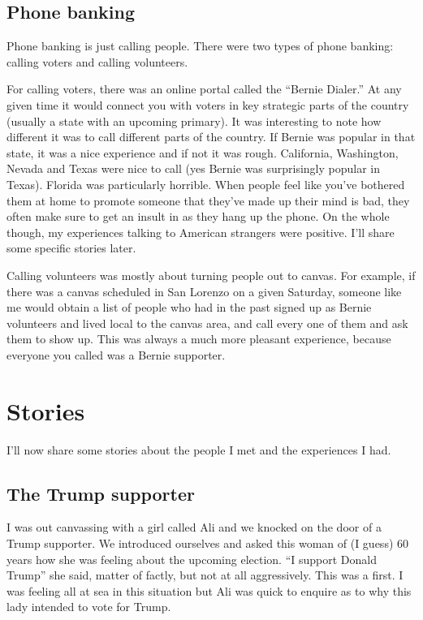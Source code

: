 \documentclass[]{book}
\begin{document}
\hypertarget{phone-banking}{%
\section{Phone banking}\label{phone-banking}}

Phone banking is just calling people. There were two types of phone banking: calling voters and calling volunteers.

For calling voters, there was an online portal called the ``Bernie Dialer.'' At any given time it would connect you with voters in key strategic parts of the country (usually a state with an upcoming primary). It was interesting to note how different it was to call different parts of the country. If Bernie was popular in that state, it was a nice experience and if not it was rough. California, Washington, Nevada and Texas were nice to call (yes Bernie was surprisingly popular in Texas). Florida was particularly horrible. When people feel like you've bothered them at home to promote someone that they've made up their mind is bad, they often make sure to get an insult in as they hang up the phone. On the whole though, my experiences talking to American strangers were positive. I'll share some specific stories later.

Calling volunteers was mostly about turning people out to canvas. For example, if there was a canvas scheduled in San Lorenzo on a given Saturday, someone like me would obtain a list of people who had in the past signed up as Bernie volunteers and lived local to the canvas area, and call every one of them and ask them to show up. This was always a much more pleasant experience, because everyone you called was a Bernie supporter.

\hypertarget{stories}{%
\chapter{Stories}\label{stories}}

I'll now share some stories about the people I met and the experiences I had.

\hypertarget{the-trump-supporter}{%
\section{The Trump supporter}\label{the-trump-supporter}}

I was out canvassing with a girl called Ali and we knocked on the door of a Trump supporter. We introduced ourselves and asked this woman of (I guess) 60 years how she was feeling about the upcoming election. ``I support Donald Trump'' she said, matter of factly, but not at all aggressively. This was a first. I was feeling all at sea in this situation but Ali was quick to enquire as to why this lady intended to vote for Trump.
\end{document}
